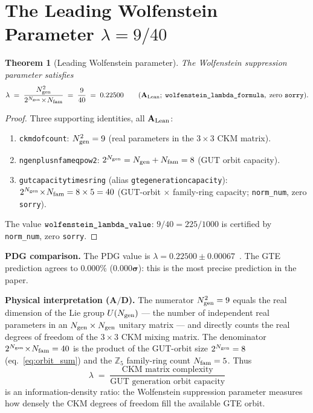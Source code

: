 \documentclass[11pt]{article}
\newtheorem{theorem}{Theorem}[section]
\theoremstyle{remark}
\newcommand{\Ngen}{N_{\rm gen}}
\newcommand{\Nfam}{N_{\rm fam}}
\newcommand{\lean}[1]{%
  \penalty-100
  \begingroup\def\_{\textunderscore\allowbreak}\texttt{#1}\endgroup}
\newcommand{\lam}{\lambda}
\newcommand{\CatAL}{\ensuremath{\textbf{A}_{\rm Lean}}}
\newcommand{\CatAD}{\textbf{A/D}}
\begin{document}
\section{The Leading Wolfenstein Parameter \boldmath$\lam = 9/40$}
\label{sec:lambda}

\begin{theorem}[Leading Wolfenstein parameter]\label{thm:lambda}
The Wolfenstein suppression parameter satisfies
\[
  \lam \;=\; \frac{\Ngen^2}{2^{\Ngen}\!\times\!\Nfam}
        \;=\; \frac{9}{40}
        \;=\; 0.22500
  \qquad (\CatAL;\;\lean{wolfenstein\_lambda\_formula},\;\text{zero }\texttt{sorry}).
\]
\end{theorem}

\begin{proof}
Three supporting identities, all $\CatAL$:
\begin{enumerate}[nosep,leftmargin=*]
\item \lean{ckm\_dof\_count}: $\Ngen^2 = 9$ (real parameters in the $3\times 3$ CKM matrix).
\item \lean{ngen\_plus\_nfam\_eq\_pow2}: $2^{\Ngen} = \Ngen+\Nfam = 8$ (GUT orbit capacity).
\item \lean{gut\_capacity\_times\_ring} (alias \lean{gte\_generation\_capacity}):
  $2^{\Ngen}\!\times\!\Nfam = 8\times 5 = 40$ (GUT-orbit $\times$ family-ring capacity;
  \texttt{norm\_num}, zero \texttt{sorry}).
\end{enumerate}
The value $\lean{wolfenstein\_lambda\_value}$: $9/40 = 225/1000$ is certified by
\texttt{norm\_num}, zero \texttt{sorry}.
\end{proof}

\textbf{PDG comparison.}
The PDG value is $\lam = 0.22500 \pm 0.00067$~\cite{ParticleDataGroup2022}.
The GTE prediction agrees to $\mathbf{0.000\%}$ ($\mathbf{0.000\sigma}$): this is the
most precise prediction in the paper.

\medskip

\textbf{Physical interpretation ($\CatAD$).}
The numerator $\Ngen^2 = 9$ equals the real dimension of the Lie group $U(N_{\rm gen})$
--- the number of independent real parameters in an $N_{\rm gen}\times N_{\rm gen}$
unitary matrix --- and directly counts the real degrees of freedom of the $3\times 3$
CKM mixing matrix.
The denominator $2^{\Ngen}\!\times\!\Nfam = 40$ is the product of the GUT-orbit size
$2^{\Ngen} = 8$ (eq.~\eqref{eq:orbit_sum}) and the $\mathbb{Z}_5$ family-ring count $\Nfam = 5$.
Thus
\[
  \lam \;=\; \frac{\text{CKM matrix complexity}}{\text{GUT generation orbit capacity}}
\]
is an information-density ratio: the Wolfenstein suppression parameter measures how
densely the CKM degrees of freedom fill the available GTE orbit.
\end{document}
